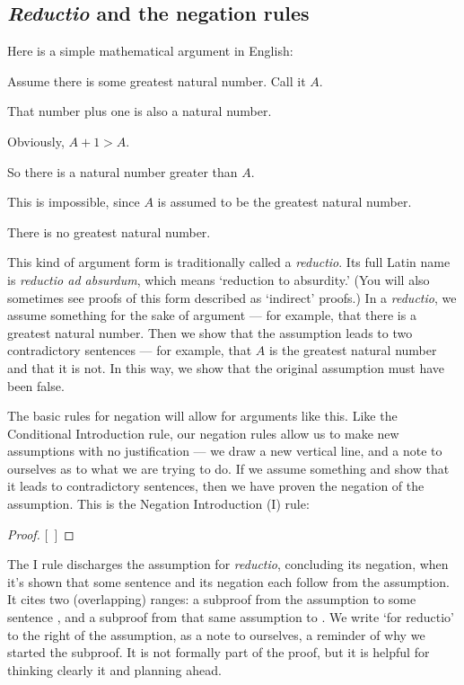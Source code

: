 \subsection{\emph{Reductio} and the negation rules}
Here is a simple mathematical argument in English:
\begin{earg}
\item[] Assume there is some greatest natural number. Call it $A$.
\item[] That number plus one is also a natural number.
\item[] Obviously, $A+1 > A$.
\item[] So there is a natural number greater than $A$.
\item[] This is impossible, since $A$ is assumed to be the greatest natural number.
\item[\therefore] There is no greatest natural number.
\end{earg}

This kind of argument form is traditionally called a \emph{reductio}. Its full Latin name is \emph{reductio ad absurdum}, which means `reduction to absurdity.' (You will also sometimes see proofs of this form described as `indirect' proofs.) In a \emph{reductio}, we assume something for the sake of argument --- for example, that there is a greatest natural number. Then we show that the assumption leads to two contradictory sentences --- for example, that $A$ is the greatest natural number and that it is not. In this way, we show that the original assumption must have been false.

The basic rules for negation will allow for arguments like this. Like the Conditional Introduction rule, our negation rules allow us to make new assumptions with no justification --- we draw a new vertical line, and a note to ourselves as to what we are trying to do. If we assume something and show that it leads to contradictory sentences, then we have proven the negation of the assumption. This is the Negation Introduction ({\enot}I) rule:

\begin{proof}
\open
	\metaA{}
	\metaB{}
\close
{}[\ ]{\enot\metaA{}}
\end{proof}

The {\enot}I rule discharges the assumption for \emph{reductio}, concluding its negation, when it's shown that some sentence and its negation each follow from the assumption. It cites two (overlapping) ranges: a subproof from the assumption to some sentence \metaB{}, and a subproof from that same assumption to \enot\metaB{}. We write `for reductio' to the right of the assumption, as a note to ourselves, a reminder of why we started the subproof. It is not formally part of the proof, but it is helpful for thinking clearly it and planning ahead.

